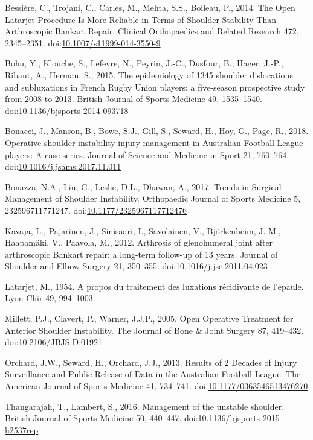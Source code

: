 \documentclass[]{elsarticle} %
\newlength{\cslhangindent}
\newenvironment{cslreferences}%
  {\setlength{\parindent}{0pt}%
  \everypar{\setlength{\hangindent}{\cslhangindent}}\ignorespaces}%
  {\par}
\begin{document}
\hypertarget{refs}{}
\begin{cslreferences}
\leavevmode\hypertarget{ref-Bessiere2014}{}%
Bessière, C., Trojani, C., Carles, M., Mehta, S.S., Boileau, P., 2014.
The Open Latarjet Procedure Is More Reliable in Terms of Shoulder
Stability Than Arthroscopic Bankart Repair. Clinical Orthopaedics and
Related Research 472, 2345--2351.
doi:\href{https://doi.org/10.1007/s11999-014-3550-9}{10.1007/s11999-014-3550-9}

\leavevmode\hypertarget{ref-Bohu2015}{}%
Bohu, Y., Klouche, S., Lefevre, N., Peyrin, J.-C., Dusfour, B., Hager,
J.-P., Ribaut, A., Herman, S., 2015. The epidemiology of 1345 shoulder
dislocations and subluxations in French Rugby Union players: a
five-season prospective study from 2008 to 2013. British Journal of
Sports Medicine 49, 1535--1540.
doi:\href{https://doi.org/10.1136/bjsports-2014-093718}{10.1136/bjsports-2014-093718}

\leavevmode\hypertarget{ref-Bonacci2018}{}%
Bonacci, J., Manson, B., Bowe, S.J., Gill, S., Seward, H., Hoy, G.,
Page, R., 2018. Operative shoulder instability injury management in
Australian Football League players: A case series. Journal of Science
and Medicine in Sport 21, 760--764.
doi:\href{https://doi.org/10.1016/j.jsams.2017.11.011}{10.1016/j.jsams.2017.11.011}

\leavevmode\hypertarget{ref-Bonazza2017}{}%
Bonazza, N.A., Liu, G., Leslie, D.L., Dhawan, A., 2017. Trends in
Surgical Management of Shoulder Instability. Orthopaedic Journal of
Sports Medicine 5, 232596711771247.
doi:\href{https://doi.org/10.1177/2325967117712476}{10.1177/2325967117712476}

\leavevmode\hypertarget{ref-Kavaja2012}{}%
Kavaja, L., Pajarinen, J., Sinisaari, I., Savolainen, V., Björkenheim,
J.-M., Haapamäki, V., Paavola, M., 2012. Arthrosis of glenohumeral joint
after arthroscopic Bankart repair: a long-term follow-up of 13 years.
Journal of Shoulder and Elbow Surgery 21, 350--355.
doi:\href{https://doi.org/10.1016/j.jse.2011.04.023}{10.1016/j.jse.2011.04.023}

\leavevmode\hypertarget{ref-Latarjet1954}{}%
Latarjet, M., 1954. A propos du traitement des luxations récidivante de
l'épaule. Lyon Chir 49, 994--1003.

\leavevmode\hypertarget{ref-Millett2005}{}%
Millett, P.J., Clavert, P., Warner, J.J.P., 2005. Open Operative
Treatment for Anterior Shoulder Instability. The Journal of Bone \&
Joint Surgery 87, 419--432.
doi:\href{https://doi.org/10.2106/JBJS.D.01921}{10.2106/JBJS.D.01921}

\leavevmode\hypertarget{ref-Orchard2013}{}%
Orchard, J.W., Seward, H., Orchard, J.J., 2013. Results of 2 Decades of
Injury Surveillance and Public Release of Data in the Australian
Football League. The American Journal of Sports Medicine 41, 734--741.
doi:\href{https://doi.org/10.1177/0363546513476270}{10.1177/0363546513476270}

\leavevmode\hypertarget{ref-Thangarajah2016}{}%
Thangarajah, T., Lambert, S., 2016. Management of the unstable shoulder.
British Journal of Sports Medicine 50, 440--447.
doi:\href{https://doi.org/10.1136/bjsports-2015-h2537rep}{10.1136/bjsports-2015-h2537rep}
\end{cslreferences}
\end{document}
